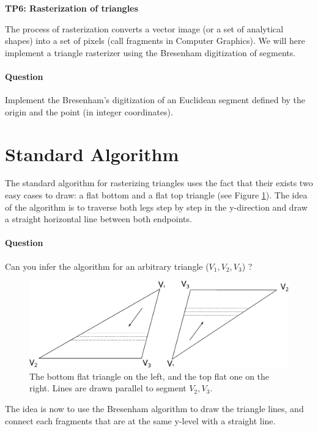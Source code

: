 \documentclass[a4paper, 11pt]{article}
\title{}
\author{}
\date{}
\begin{document}
\begin{center}
	\LARGE \textbf{TP6: Rasterization of triangles}
\end{center}

\bigskip
\par The process of rasterization converts a vector image (or a set of analytical shapes) into a set of pixels (call fragments in Computer Graphics).
We will here implement a triangle rasterizer using the Bresenham digitization of segments.

\paragraph{Question} Implement the Bresenham's digitization of an Euclidean segment defined by the origin and the point (in integer coordinates).

\section*{Standard Algorithm}

The standard algorithm for rasterizing triangles uses the fact that their exists two easy cases to draw: a flat bottom and a flat top triangle (see Figure \ref{fig:triangles}).
The idea of the algorithm is to traverse both legs step by step in the y-direction and draw a straight horizontal line between both endpoints.

\paragraph{Question} Can you infer the algorithm for an arbitrary triangle ($V_1,V_2,V_3$) ?

\begin{figure}
  \centering
  \includegraphics[width=\textwidth]{triangles}
  \caption{The bottom flat triangle on the left, and the top flat one on the right. Lines are drawn parallel to segment $V_2,V_3$.}
  \label{fig:triangles}
\end{figure}

\vspace{5mm}
\noindent The idea is now to use the Bresenham algorithm to draw the triangle lines, and connect each fragments that are at the same y-level with a straight line.
\end{document}
